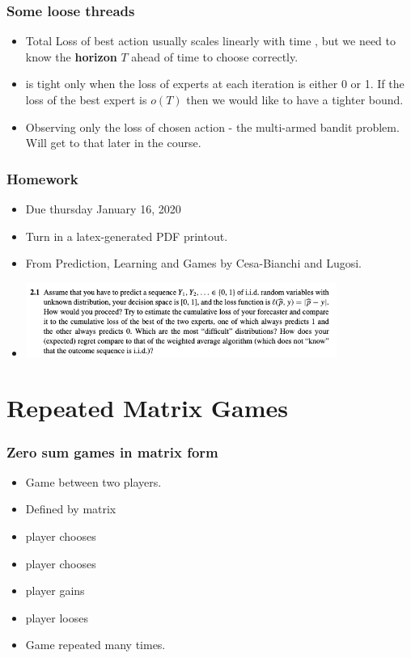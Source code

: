 \documentclass[handout]{beamer}
\begin{document}
\begin{frame}
\frametitle{Some loose threads}
\begin{itemize}
\item Total Loss of best action usually scales linearly with time
  , but we need to know the {\bf horizon} $T$ ahead of time to
  choose \R{$\eta$} correctly.
  \item {} is tight only when the loss of experts at each iteration is
    either 0 or 1. If the loss of the best expert is $o(T)$ then we
    would like to have a tighter bound.
\item Observing only the loss of chosen action - the multi-armed
  bandit problem. Will get to that later in the course.
\end{itemize}
\end{frame}


\begin{frame}
\frametitle{Homework}
\begin{itemize}
\item
  Due thursday January 16, 2020
\item
  Turn in a latex-generated PDF printout.
\item
  From Prediction, Learning and Games by Cesa-Bianchi and Lugosi.
\item
\includegraphics[width=4in]{HW1.png}
\end{itemize}
\end{frame}

\section{Repeated Matrix Games}

\begin{frame}
\frametitle{Zero sum games in matrix form}
\begin{itemize}
\item Game between two players.
\item Defined by  matrix \R{$\M$}
\item {} player chooses 
\item {} player chooses 
\item {} player gains 
\item {} player looses 
\item Game repeated many times.
\end{itemize}
\end{frame}
\end{document}
